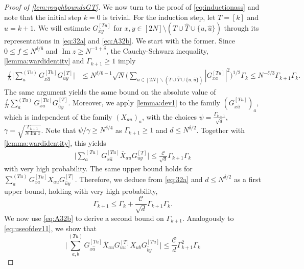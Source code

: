 \documentclass[11pt]{article}
\DeclareMathOperator{\Ima}{Im}
\theoremstyle{plain}
\theoremstyle{remark}
\numberwithin{equation}{section}
\newcommand*\barr[1]{\overline{#1}}
\newcommand*\bset[1]{[#1]}
\newcommand*\ubarr[1]{{\widehat{#1}}}
\begin{document}
\begin{proof}[Proof of \cref{lem:roughboundsGT}]
		We now turn to the proof of \cref{eq:inductionass} and note that the initial step $k=0$ is trivial. For the induction step, let $T = [k]$ and $u =k+1$. 
		We will estimate $G_{xy}^{\bset{Tu}}$ for $x,y \in [2N]\setminus ( T \cup \ubarr{T} \cup \{u,\ubarr{u}\})$ through its representations in \cref{eq:32a} and \cref{eq:A32b}. 
		We start with the former. 
		Since  $0 \le f \le N^{\delta/6}$ and $\Ima z \ge N^{-1 + \delta}$, the Cauchy-Schwarz inequality,   \cref{lemma:wardidentity} and $\Gamma_{k+1} \geq 1$ imply
		\begin{align}
			\frac{f}{N}\biggl|\sum_{a}^{(Tu)} G_{x\ubarr{a}}^{\bset{Tu}} G_{uy}^{\bset{T}}\biggr|&\le N^{\delta/6 -1} \sqrt{N} \biggl( \sum_{a\in [2N] \backslash ( T \cup \ubarr{T} \cup \{u,\ubarr{u}\})}\left|G_{xa}^{\bset{Tu}}\right|^2\biggr)^{1/2}\Gamma_{k}
			\le N^{-\delta/3}  \Gamma_{k+1}\Gamma_k. \label{eq:boundoforf1}
		\end{align}
	 The same argument yields the same bound on the absolute value of $\frac{f}{N} \sum_{a}^{(Tu)} G_{xa}^{\bset{Tu}} G_{\ubarr{u}y}^{\bset{T}}$. Moreover, we apply     \cref{lemma:dev1} to the family $ (G_{x\ubarr{a}}^{\bset{Tu}})_{a}$, which is independent of the family $(X_{au})_{a}$, with the choices $\psi = \frac{\Gamma_{k+1}}{\sqrt{d}}$, $\gamma = \sqrt{\frac{\Gamma_{k+1}}{N\Ima z}}$. 
		Note that $\psi/\gamma \geq N^{\delta/4}$ as $\Gamma_{k+1} \geq 1$ and $d \leq N^{\delta/2}$. 
		Together with \cref{lemma:wardidentity}, this yields
		\begin{align}\label{eq:useofdev11}
			\biggl| \sum_{a}^{(Tu)} G_{x\ubarr{a}}^{\bset{Tu}} \barr{X}_{au} G_{uy}^{\bset{T}} \biggr| \le  \frac{\mathcal{C}}{\sqrt{d}}\Gamma_{k+1} \Gamma_{k}
		\end{align}
		with very high probability. The same upper bound holds for $\sum_{a}^{(Tu)} G_{xa}^{\bset{Tu}} X_{au} G_{\ubarr{u}y}^{\bset{T}}$. 
		Therefore, we deduce from \cref{eq:32a} and $d \leq N^{\delta/2}$ as a first upper bound, holding with very high probability, 
		\begin{equation}\label{eq:upbound1}
			\Gamma_{k+1} \le \Gamma_{k} + \frac{\mathcal{C}}{\sqrt{d}} \Gamma_{k+1}\Gamma_k.
		\end{equation}
		We now use \cref{eq:A32b} to derive a second bound on $\Gamma_{k+1}$. 
		Analogously to \cref{eq:useofdev11}, we show that 
		\begin{equation}\label{eq:useofdev12}
			\biggl| \sum_{a,b}^{(Tu)} G_{x\ubarr{a}}^{\bset{Tu}} \barr{X}_{au} G_{uu}^{\bset{T}} X_{ub} G_{\ubarr{b}y}^{\bset{Tu}}\biggr|\le \frac{\mathcal{C}}{d} \Gamma^{2}_{k+1} \Gamma_{k}

\end{equation}
\end{proof}
\end{document}
